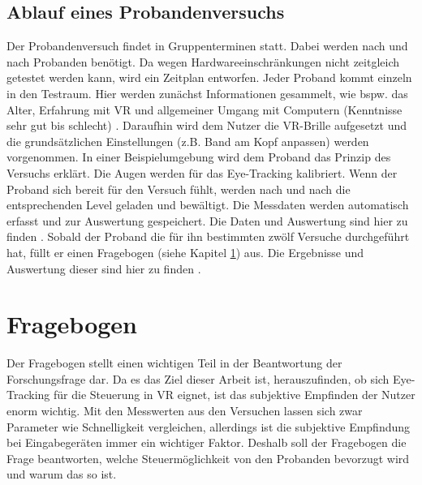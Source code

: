 \subsection{Ablauf eines Probandenversuchs}
Der Probandenversuch findet in Gruppenterminen statt. Dabei werden nach und nach Probanden benötigt. Da wegen Hardwareeinschränkungen nicht zeitgleich getestet werden kann, wird ein Zeitplan entworfen. Jeder Proband kommt einzeln in den Testraum. Hier werden zunächst Informationen gesammelt, wie bspw. das Alter, Erfahrung mit VR und allgemeiner Umgang mit Computern (Kenntnisse sehr gut bis schlecht) . Daraufhin wird dem Nutzer die VR-Brille aufgesetzt und die grundsätzlichen Einstellungen (z.B. Band am Kopf anpassen) werden vorgenommen. In einer Beispielumgebung wird dem Proband das Prinzip des Versuchs erklärt. Die Augen werden für das Eye-Tracking kalibriert. Wenn der Proband sich bereit für den Versuch fühlt, werden nach und nach die entsprechenden Level geladen und bewältigt. Die Messdaten werden automatisch erfasst und zur Auswertung gespeichert. Die Daten und Auswertung sind hier zu finden . Sobald der Proband die für ihn bestimmten zwölf Versuche durchgeführt hat, füllt er einen Fragebogen (siehe Kapitel \ref{section:fragebogen}) aus. Die Ergebnisse und Auswertung dieser sind hier zu finden .

\section{Fragebogen} 
\label{section:fragebogen}
Der Fragebogen stellt einen wichtigen Teil in der Beantwortung der Forschungsfrage dar. Da es das Ziel dieser Arbeit ist, herauszufinden, ob sich Eye-Tracking für die Steuerung in VR eignet, ist das subjektive Empfinden der Nutzer enorm wichtig. Mit den Messwerten aus den Versuchen lassen sich zwar Parameter wie Schnelligkeit vergleichen, allerdings ist die subjektive Empfindung bei Eingabegeräten immer ein wichtiger Faktor. Deshalb soll der Fragebogen die Frage beantworten, welche Steuermöglichkeit von den Probanden bevorzugt wird und warum das so ist.
